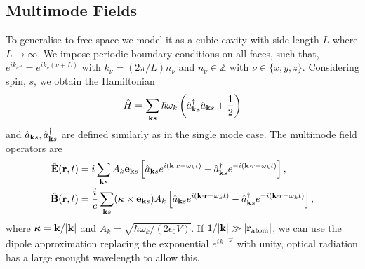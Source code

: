 \subsection{Multimode Fields}\label{sec:multimode}
To generalise to free space we model it as a cubic cavity with side length $L$ where $L\to\infty$. We impose periodic boundary conditions on all faces, such that, $e^{ik_\nu \nu} = e^{ik_\nu (\nu + L)}$ with $k_\nu = (2\pi/L)n_\nu$ and $n_\nu \in \mathbb{Z}$ with $\nu \in \{x, y, z\}$. Considering spin, $s$, we obtain the Hamiltonian
\begin{equation}
    \hat{H} = \sum_{\bm{\mathrm{k}} s} \hbar \omega_k \left( \hat{a}^\dagger_{\bm{\mathrm{k}} s}\hat{a}_{\bm{\mathrm{k}} s} + \frac 1 2  \right)
\end{equation}
and $\hat{a}_{\bm{\mathrm{k}} s}, \hat{a}^\dagger_{\bm{\mathrm{k}} s}$ are defined similarly as in the single mode case. The multimode field operators are
\begin{align}
    \hat{\bm{\mathrm{E}}}(\bm{\mathrm{r}}, t) &= i \sum_{\bm{\mathrm{k}} s} A_k \bm{\mathrm{e}}_{\bm{\mathrm{k}} s} \left[ \hat{a}_{\bm{\mathrm{k}} s} e^{i(\bm{\mathrm{k}} \cdot \bm{\mathrm{r}} - \omega_k t)} - \hat{a}^\dagger_{\bm{\mathrm{k}} s} e^{-i(\bm{\mathrm{k}} \cdot r - \omega_k t)} \right],\\
    \hat{\bm{\mathrm{B}}}(\bm{\mathrm{r}}, t) &= \frac{i}{c} \sum_{\bm{\mathrm{k}} s} (\bm{\mathrm{\kappa}} \times \bm{\mathrm{e}}_{\bm{\mathrm{k}} s} ) A_k \left[ \hat{a}_{\bm{\mathrm{k}} s} e^{i(\bm{\mathrm{k}} \cdot \bm{\mathrm{r}} - \omega_k t)} - \hat{a}^\dagger_{\bm{\mathrm{k}} s} e^{-i(\bm{\mathrm{k}} \cdot r - \omega_k t)} \right],
\end{align}
where $\bm{\mathrm{\kappa}} = \bm{\mathrm{k}} /\abs{\bm{\mathrm{k}}}$ and $A_k = \sqrt{\hbar \omega_k/ (2 \epsilon_0 V)}$. If $1 / \abs{\bm{\mathrm{k}}} \gg \abs{\bm{\mathrm{r}}_{\text{atom}}}$, we can use the dipole approximation replacing the exponential $e^{i\vec k \cdot \vec r}$ with unity, optical radiation has a large enought wavelength to allow this. 

